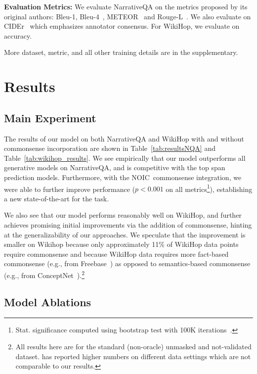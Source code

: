 \documentclass[11pt,a4paper]{article}
\def\tabref#1{Table~\ref{#1}}
\newcommand{\fullModel}{NOIC}
\begin{document}
\noindent\textbf{Evaluation Metrics:}
We evaluate NarrativeQA on the metrics proposed by its original authors: Bleu-1, Bleu-4~\cite{papineni2002bleu}, METEOR~\cite{banerjee2005meteor} and Rouge-L~\cite{lin2004rouge}.
We also evaluate on CIDEr~\cite{vedantam2015cider} which emphasizes annotator consensus.
For WikiHop, we evaluate on accuracy.


More dataset, metric, and all other training details are in the supplementary.

 \section{Results}
\label{sec:results}
\subsection{Main Experiment}

The results of our model on both NarrativeQA and WikiHop with and without commonsense incorporation are shown in \tabref{tab:resultsNQA} and \tabref{tab:wikihop_results}.
We see empirically that our model outperforms all generative models on NarrativeQA, and is competitive with the top span prediction models.
Furthermore, with the \fullModel\ commonsense integration, we were able to further improve performance ($p<0.001$ on all metrics\footnote{Stat. significance computed using bootstrap test with 100K iterations~\cite{noreen1989computer,efron1994introduction}.}), establishing a new state-of-the-art for the task.

We also see that our model performs reasonably well on WikiHop, and further achieves promising initial improvements via the addition of commonsense, hinting at the generalizability of our approaches. We speculate that the improvement is smaller on Wikihop because only approximately 11\% of WikiHop data points require commonsense and because WikiHop data requires more fact-based commonsense (e.g., from Freebase~\cite{bollacker2008freebase}) as opposed to semantics-based commonsense (e.g., from ConceptNet~\cite{speer2012representing}).\footnote{All results here are for the standard (non-oracle) unmasked and not-validated dataset.  has reported higher numbers on different data settings which are not comparable to our results.}


\subsection{Model Ablations}
\end{document}
